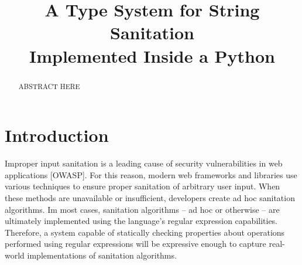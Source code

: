 \documentclass{acm_proc_article-sp}
\theoremstyle{definition}
\begin{document}


\newcommand{\Ace}{\textsf{Ace}}

\title{A Type System for String Sanitation\\Implemented Inside a Python}


\maketitle
\begin{abstract}
ABSTRACT HERE
\end{abstract}

\section{Introduction}\label{intro}
Improper input sanitation is a leading cause of security vulnerabilities in web
applications [OWASP].
For this reason, modern web frameworks and libraries use various techniques to
ensure proper sanitation of arbitrary user input. When
these methods are unavailable or insufficient, developers create 
ad hoc sanitation algorithms. Im most cases, sanitation algorithms -- ad hoc 
or otherwise -- are ultimately implemented using the language's regular
expression capabilities. Therefore, a system capable of statically 
checking properties about operations performed using regular expressions will
be expressive enough to capture real-world implementations of sanitation 
algorithms.
\end{document}
